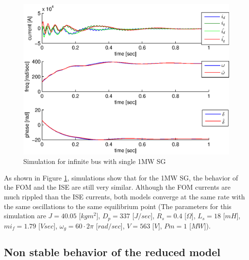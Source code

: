 \documentclass[conference]{IEEEtran}
\begin{document}
\begin{figure}[ht]
\includegraphics[scale=0.6]{sim1MWInfBus}

\caption{Simulation for infinite bus with single 1MW SG}
\label{fig:InfBusOne1MWSG}
\end{figure}

As shown in Figure \ref{fig:InfBusOne1MWSG}, simulations show that
for the 1MW SG, the behavior of the FOM and the ISE are still very similar. Although the FOM currents
are much rippled than the ISE currents, both models converge
at the same rate with the same oscillations to the same equilibrium
point (The parameters for this simulation are $J=40.05$ {[}$kgm^{2}${]},
$D_{p}=337$ {[}$J/sec${]}, $R_{s}=0.4$ {[}$\Omega]$, $L_{s}=18$
{[}$mH${]}, $mi_{f}=1.79$ {[}$Vsec]$, $\omega_{g}=60\cdotp2\pi$
{[}$rad/sec${]}, $V=563$ {[}$V]$, $Pm=1$ {[}$MW${]}). 

\subsection{Non stable behavior of the reduced model}
\end{document}

